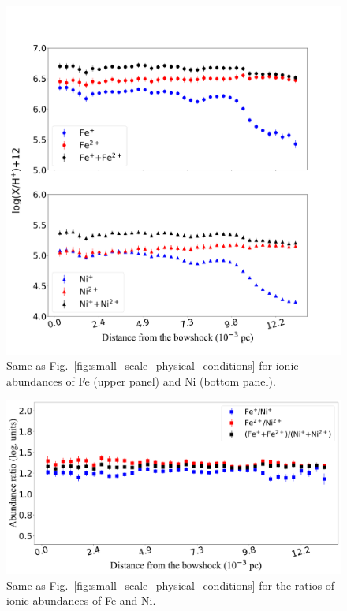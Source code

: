 \documentclass[twocolumn,linenumbers]{aastex63}
\begin{document}
\begin{figure}
\centering
\includegraphics[width=\columnwidth]{ni_fe_abundances.pdf}
\caption{Same as Fig.~\ref{fig:small_scale_physical_conditions} for ionic abundances of Fe (upper panel) and Ni (bottom panel). }
\label{fig:fe_ni_abundances}
\end{figure}

\begin{figure}
\centering
\includegraphics[width=\columnwidth]{Ni_Fe_ionic_ratios_distribution.pdf}
\caption{Same as Fig.~\ref{fig:small_scale_physical_conditions} for the ratios of ionic abundances of Fe and Ni.}
\label{fig:Fe_Ni_abundance_ratios}
\end{figure}
\end{document}

